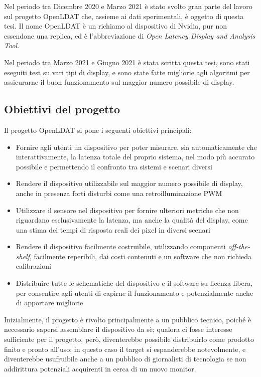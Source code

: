 Nel periodo tra Dicembre 2020 e Marzo 2021 è stato svolto gran parte del lavoro sul progetto OpenLDAT che, assieme ai dati sperimentali, è oggetto di questa tesi. Il nome OpenLDAT è un richiamo al dispositivo di Nvidia, pur non essendone una replica, ed è l'abbreviazione di \textit{Open Latency Display and Analysis Tool}.

Nel periodo tra Marzo 2021 e Giugno 2021 è stata scritta questa tesi, sono stati eseguiti test su vari tipi di display, e sono state fatte migliorie agli algoritmi per assicurarne il buon funzionamento sul maggior numero possibile di display.

\subsection{Obiettivi del progetto}
Il progetto OpenLDAT si pone i seguenti obiettivi principali:
\begin{itemize}
	\item Fornire agli utenti un dispositivo per poter misurare, sia automaticamente che interattivamente, la latenza totale del proprio sistema, nel modo più accurato possibile e permettendo il confronto tra sistemi e scenari diversi
	\item Rendere il dispositivo utilizzabile sul maggior numero possibile di display, anche in presenza forti disturbi come una retroilluminazione PWM
	\item Utilizzare il sensore nel dispositivo per fornire ulteriori metriche che non riguardano esclusivamente la latenza, ma anche la qualità del display, come una stima dei tempi di risposta reali dei pixel in diversi scenari
	\item Rendere il dispositivo facilmente costruibile, utilizzando componenti \textit{off-the-shelf}, facilmente reperibili, dai costi contenuti e un software che non richieda calibrazioni
	\item Distribuire tutte le schematiche del dispositivo e il software su licenza libera, per consentire agli utenti di capirne il funzionamento e potenzialmente anche di apportare migliorie
\end{itemize}

Inizialmente, il progetto è rivolto principalmente a un pubblico tecnico, poiché è necessario sapersi assemblare il dispositivo da sè; qualora ci fosse interesse sufficiente per il progetto, però, diventerebbe possibile distribuirlo come prodotto finito e pronto all'uso; in questo caso il target si espanderebbe notevolmente, e diventerebbe usufruibile anche a un pubblico di giornalisti di tecnologia se non addirittura potenziali acquirenti in cerca di un nuovo monitor.

